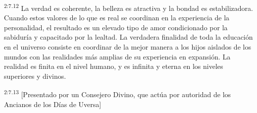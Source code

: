 \par
\textsuperscript{2:7.12} La verdad es coherente, la belleza es atractiva y la bondad es estabilizadora. Cuando estos valores de lo que es real se coordinan en la experiencia de la personalidad, el resultado es un elevado tipo de amor condicionado por la sabiduría y capacitado por la lealtad. La verdadera finalidad de toda la educación en el universo consiste en coordinar de la mejor manera a los hijos aislados de los mundos con las realidades más amplias de su experiencia en expansión. La realidad es finita en el nivel humano, y es infinita y eterna en los niveles superiores y divinos.

\par
\textsuperscript{2:7.13} [Presentado por un Consejero Divino, que actúa por autoridad de los Ancianos de los Días de Uversa]